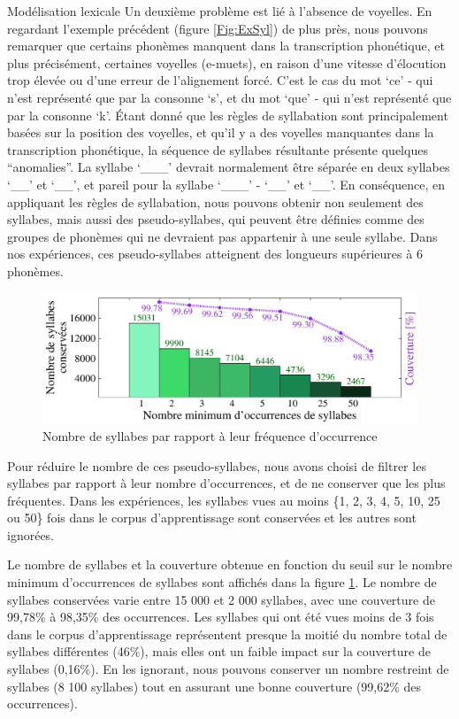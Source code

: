 \documentclass{style/these}
\begin{document}
\begin{part}{Modélisation lexicale}
Un deuxième problème est lié à l'absence de voyelles. 
En regardant l'exemple précédent (figure \ref{Fig:ExSyl}) de plus près, nous pouvons remarquer que certains phonèmes manquent dans la transcription phonétique, et plus précisément, certaines voyelles (e-muets), en raison d'une vitesse d'élocution trop élevée ou d'une erreur de l'alignement forcé. 
C'est le cas du mot `ce' - qui n'est représenté que par la consonne `s', et du mot `que' - qui n'est représenté que par la consonne `k'. 
Étant donné que les règles de syllabation sont principalement basées sur la position des voyelles, et qu'il y a des voyelles manquantes dans la transcription phonétique, la séquence de syllabes résultante présente quelques ``anomalies''. La syllabe `\_\_\_' devrait normalement être séparée en deux syllabes `\_\_' et `\_\_', et pareil pour la syllabe `\_\_\_' - `\_\_' et `\_\_'. 
En conséquence, en appliquant les règles de syllabation, nous pouvons obtenir non seulement des syllabes, mais aussi des pseudo-syllabes, qui peuvent être définies comme des groupes de phonèmes qui ne devraient pas appartenir à une seule syllabe. 
Dans nos expériences, ces pseudo-syllabes atteignent des longueurs supérieures à 6 phonèmes. 

\begin{figure}[h!]
\centering
\includegraphics[scale=0.7]{images/results/couverture_syllables_minocc.pdf}
\caption{Nombre de syllabes par rapport à leur fréquence d'occurrence}
\label{Fig:s-minocc}
\end{figure}

Pour réduire le nombre de ces pseudo-syllabes, nous avons choisi de filtrer les syllabes par rapport à leur nombre d'occurrences, et de ne conserver que les plus fréquentes. Dans les expériences, les syllabes vues au moins \{1, 2, 3, 4, 5, 10, 25 ou 50\} fois dans le corpus d'apprentissage sont conservées et les autres sont ignorées. 

Le nombre de syllabes et la couverture obtenue en fonction du seuil sur le nombre minimum d'occurrences de syllabes sont affichés dans la figure \ref{Fig:s-minocc}. 
Le nombre de syllabes conservées varie entre 15 000 et 2 000 syllabes, avec une couverture de 99,78\% à 98,35\% des occurrences. 
Les syllabes qui ont été vues moins de 3 fois dans le corpus d'apprentissage représentent presque la moitié du nombre total de syllabes  différentes (46\%), mais elles ont un faible impact sur la couverture de syllabes (0,16\%). 
En les ignorant, nous pouvons conserver un nombre restreint de syllabes (8 100 syllabes) tout en assurant une bonne couverture (99,62\% des occurrences).


\end{part}
\end{document}
